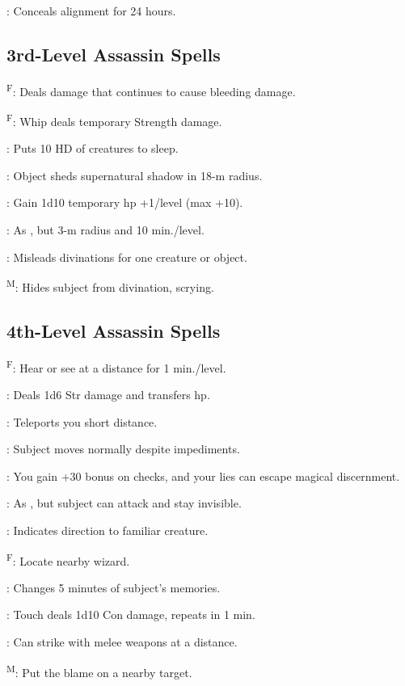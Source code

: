 : Conceals alignment for 24 hours.




\subsection{3rd-Level Assassin Spells}

\textsuperscript{F}: Deals damage that continues to cause bleeding damage.%

\textsuperscript{F}: Whip deals temporary Strength damage. %

: Puts 10 HD of creatures to sleep.

: Object sheds supernatural shadow in 18-m radius.

: Gain 1d10 temporary hp +1/level (max +10).

: As , but 3-m radius and 10 min./level.

: Misleads divinations for one creature or object.

\textsuperscript{M}: Hides subject from divination, scrying.




\subsection{4th-Level Assassin Spells}

\textsuperscript{F}: Hear or see at a distance for 1 min./level.

: Deals 1d6 Str damage and transfers hp. %

: Teleports you short distance.

: Subject moves normally despite impediments.

: You gain +30 bonus on  checks, and your lies can escape magical discernment.

: As , but subject can attack and stay invisible.

: Indicates direction to familiar creature.

\textsuperscript{F}: Locate nearby wizard. %

: Changes 5 minutes of subject's memories.

: Touch deals 1d10 Con damage, repeats in 1 min.

: Can strike with melee weapons at a distance. %

\textsuperscript{M}: Put the blame on a nearby target. %
